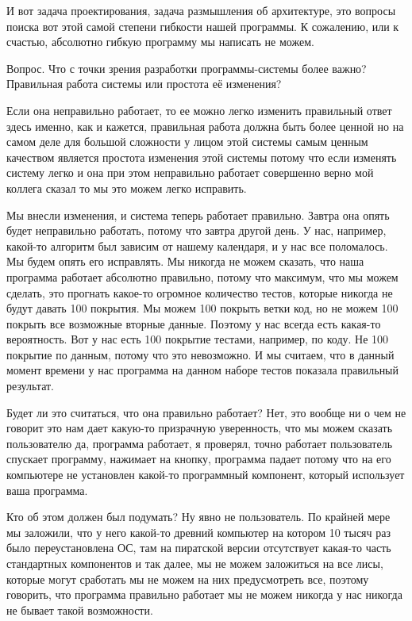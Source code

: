 И вот задача проектирования, задача размышления об архитектуре, это вопросы поиска вот этой самой степени гибкости нашей программы. К сожалению, или к счастью, абсолютно гибкую программу мы написать не можем.

Вопрос. Что с точки зрения разработки программы-системы более важно? Правильная работа системы или простота её изменения?

Если она неправильно работает, то ее можно легко изменить правильный ответ здесь именно, как и кажется, правильная работа должна быть более ценной но на самом деле для большой сложности у лицом этой системы самым ценным качеством является простота изменения этой системы потому что если изменять систему легко и она при этом неправильно работает совершенно верно мой коллега сказал
то мы это можем легко исправить. 

Мы внесли изменения, и система теперь работает правильно. Завтра она опять будет неправильно работать, потому что завтра другой день. У нас, например, какой-то алгоритм был зависим от нашему календаря, и у нас все поломалось. Мы будем опять его исправлять. Мы никогда не можем сказать, что наша программа работает абсолютно правильно, потому что максимум, что мы можем сделать, это прогнать какое-то огромное количество тестов, которые никогда не будут давать 100 покрытия. Мы можем 100 покрыть ветки код, но не можем 100 покрыть все возможные вторные данные. Поэтому у нас всегда есть какая-то вероятность. Вот у нас есть 100 покрытие тестами, например, по коду. Не 100 покрытие по данным, потому что это невозможно. И мы считаем, что в данный момент времени у нас программа на данном наборе тестов показала правильный результат.

Будет ли это считаться, что она правильно работает? Нет, это вообще ни о чем не говорит это нам дает какую-то призрачную уверенность, что мы можем сказать пользователю да, программа работает, я проверял, точно работает пользователь спускает программу, нажимает на кнопку, программа падает потому что на его компьютере не установлен какой-то программный компонент, который использует ваша программа.

Кто об этом должен был подумать? Ну явно не пользователь. По крайней мере мы заложили, что у него какой-то древний компьютер на котором 10 тысяч раз было переустановлена ОС, там на пиратской версии отсутствует какая-то часть стандартных компонентов и так далее, мы не можем заложиться на все лисы, которые могут сработать мы не можем на них предусмотреть все, поэтому говорить, что программа правильно работает мы не можем никогда у нас никогда не бывает такой возможности.

